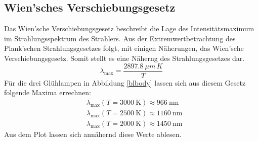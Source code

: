 \subsection*{Wien'sches Verschiebungsgesetz}
Das Wien'sche Verschiebungsgesetz beschreibt die Lage des Intensitätsmaximum im Strahlungsspektrum des Strahlers. Aus der Extremwertbetrachtung des Plank'schen Strahlungsgesetzes folgt, mit einigen Näherungen, das Wien'sche Verschiebungsgesetz. Somit stellt es eine Näherng des Strahlungsgesetzes dar.
\[ \lambda_{\text{max}} = \frac{\SI{2897,8}{\mu m} \, K}{T} \]
Für die drei Glühlampen in Abbildung \ref{blbody} lassen sich aus diesem Gesetz folgende Maxima errechnen:
\begin{align*}
	&\lambda_{\text{max}} (T=\SI{3000}{\kelvin}) \approx \SI{966}{\nano \meter} \\
	&\lambda_{\text{max}} (T=\SI{2500}{\kelvin}) \approx \SI{1160}{\nano \meter}\\
	&\lambda_{\text{max}} (T=\SI{2000}{\kelvin}) \approx \SI{1450}{\nano \meter}
\end{align*}
Aus dem Plot lassen sich annähernd diese Werte ablesen.
